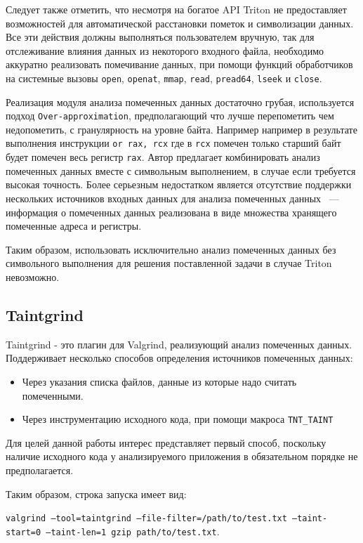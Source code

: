 Следует также отметить, что несмотря на богатое API Triton не предоставляет возможностей для автоматической расстановки пометок и символизации данных. Все эти действия должны выполняться пользователем вручную, так для отслеживание влияния данных из некоторого входного файла, необходимо аккуратно реализовать помечивание данных, при помощи функций обработчиков на системные вызовы \texttt{open}, \texttt{openat}, \texttt{mmap}, \texttt{read}, \texttt{pread64}, \texttt{lseek} и \texttt{close}.

Реализация модуля анализа помеченных данных достаточно грубая, используется подход 
\texttt{Over-approximation}, предполагающий что лучше перепометить чем недопометить, с гранулярность на уровне байта. Например например в результате выполнения инструкции \texttt{or rax, rcx} где в \texttt{rcx} помечен только старший байт будет помечен весь регистр \texttt{rax}. Автор предлагает комбинировать анализ помеченных данных вместе с символьным выполнением, в случае если требуется высокая точность.
Более серьезным недостатком является отсутствие поддержки нескольких источников входных данных для анализа помеченных данных ~--- информация о помеченных данных реализована в виде множества хранящего помеченные адреса и регистры.

Таким образом, использовать исключительно анализ помеченных данных без символьного выполнения для решения поставленной задачи в случае Triton невозможно.

\subsection{Taintgrind}

Taintgrind\cite{Taintgrind} - это плагин для Valgrind, реализующий анализ помеченных данных. Поддерживает несколько способов определения источников помеченных данных:
\begin{itemize}
    \item Через указания списка файлов, данные из которые надо считать помеченными.
    \item Через инструментацию исходного кода, при помощи макроса \texttt{TNT\_TAINT}
\end{itemize}

Для целей данной работы интерес представляет первый способ, поскольку наличие исходного кода у анализируемого приложения в обязательном порядке не предполагается.

Таким образом, строка запуска имеет вид:
\bigskip

        \texttt{valgrind --tool=taintgrind --file-filter=/path/to/test.txt --taint-start=0 --taint-len=1 gzip path/to/test.txt}.


